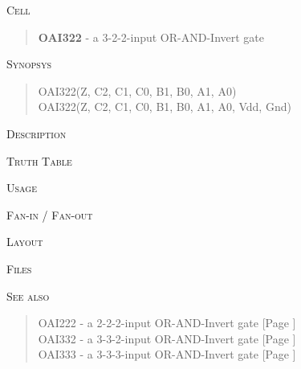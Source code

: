 
\label{OAI322}
\textsc{Cell}
\begin{quote}
    \textbf{OAI322} - a 3-2-2-input OR-AND-Invert gate
\end{quote}

\textsc{Synopsys}
\begin{quote}
    OAI322(Z, C2, C1, C0, B1, B0, A1, A0) \\
    OAI322(Z, C2, C1, C0, B1, B0, A1, A0, Vdd, Gnd)
\end{quote}

\textsc{Description}

%

\textsc{Truth Table}


\textsc{Usage}

\textsc{Fan-in / Fan-out}

\textsc{Layout}

\textsc{Files}

\textsc{See also}
\begin{quote}
    OAI222 - a 2-2-2-input OR-AND-Invert gate [Page \pageref{OAI222}] \\
    OAI332 - a 3-3-2-input OR-AND-Invert gate [Page \pageref{OAI332}] \\
    OAI333 - a 3-3-3-input OR-AND-Invert gate [Page \pageref{OAI333}]
\end{quote}
